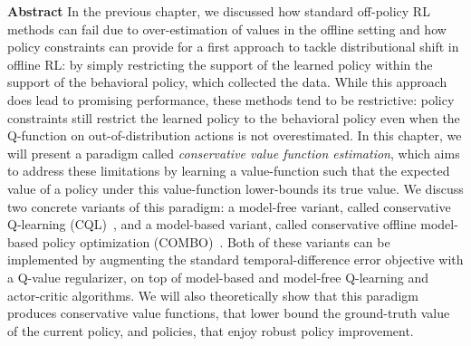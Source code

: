 \documentclass[../thesis.tex]{subfiles}
\begin{document}

\vspace{-0.4cm}
\begin{AIbox}{\large{\textbf{Abstract}}}
\vspace{4mm}
In the previous chapter, we discussed how standard off-policy RL methods can fail due to over-estimation of values in the offline setting and how policy constraints can provide for a first approach to tackle distributional shift in offline RL: by simply restricting the support of the learned policy within the support of the behavioral policy, which collected the data. While this approach does lead to promising performance, these methods tend to be restrictive: policy constraints still restrict the learned policy to the behavioral policy even when the Q-function on out-of-distribution actions is not overestimated.                 
In this chapter, we will present a paradigm called \emph{conservative value function estimation}, which aims to address these limitations by learning a value-function such that the expected value of a policy under this value-function lower-bounds its true value. We discuss two concrete variants of this paradigm: a model-free variant, called conservative Q-learning (CQL)~\citep{kumar2020conservative}, and a model-based variant, called conservative offline model-based policy optimization (COMBO)~\citep{yu2021conservative}. Both of these variants can be implemented by augmenting the standard temporal-difference error objective with a Q-value regularizer, on top of model-based and model-free Q-learning and actor-critic algorithms. We will also theoretically show that this paradigm produces conservative value functions, that lower bound the ground-truth value of the current policy, and policies, that enjoy robust policy improvement.
\vspace{2mm}
\end{AIbox}
\end{document}
